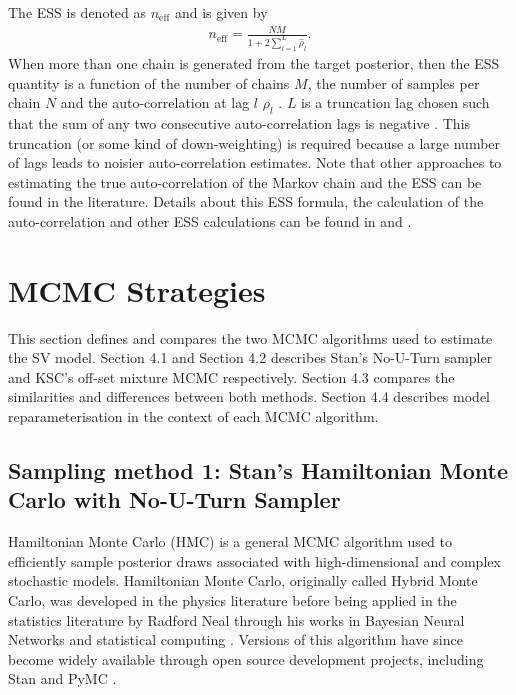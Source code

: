 \documentclass[12pt, a4paper]{article}
\begin{document}
            The ESS is denoted as $n_{\text{eff}}$ and is given by
            \begin{align}
                n_{\text{eff}} = \frac{NM}{1+2 \sum_{l=1}^L \hat{\rho}_l}.
            \end{align}
            When more than one chain is generated from the target posterior, then the ESS quantity is a function of the number of chains $M$, the number of samples per chain $N$ and the auto-correlation at lag $l$ $\rho_l$ \citep{vehtari2021rank}. $L$ is a truncation lag chosen such that the sum of any two consecutive auto-correlation lags is negative \citep{geyer1992practical}. This truncation (or some kind of down-weighting) is required because a large number of lags leads to noisier auto-correlation estimates. Note that other approaches to estimating the true auto-correlation of the Markov chain and the ESS can be found in the literature. Details about this ESS formula, the calculation of the auto-correlation and other ESS calculations can be found in \citet{vehtari2021rank} and \citet{geyer1992practical}.

\section{MCMC Strategies}
This section defines and compares the two MCMC algorithms used to estimate the SV model. Section 4.1 and Section 4.2 describes Stan's No-U-Turn sampler and KSC's off-set mixture MCMC respectively. Section 4.3 compares the similarities and differences between both methods. Section 4.4 describes model reparameterisation in the context of each MCMC algorithm. 
    \subsection{Sampling method 1: Stan's Hamiltonian Monte Carlo with No-U-Turn Sampler}
        Hamiltonian Monte Carlo (HMC) is a general MCMC algorithm used to efficiently sample posterior draws associated with high-dimensional and complex stochastic models. Hamiltonian Monte Carlo, originally called Hybrid Monte Carlo, was developed in the physics literature \citep{duane1987hybrid} before being applied in the statistics literature by Radford Neal through his works in Bayesian Neural Networks \citep{neal1995bayesian} and statistical computing \citep{neal2011mcmc}. Versions of this algorithm have since become widely available through open source development projects, including Stan \citep{stan} and PyMC \citep{pymc2023}.
\end{document}
